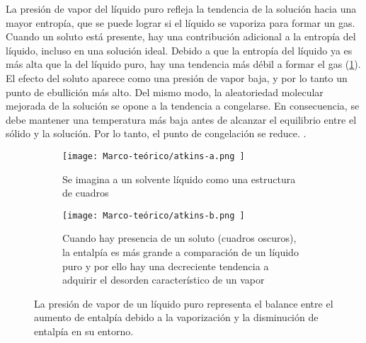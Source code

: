 			\begin{displayquote}
				La presión de vapor del líquido puro refleja la tendencia de la solución hacia una mayor entropía, que se puede lograr si el líquido se vaporiza para formar un gas. Cuando un soluto está presente, hay una contribución adicional a la entropía del líquido, incluso en una solución ideal. Debido a que la entropía del líquido ya es más alta que la del líquido puro, hay una tendencia más débil a formar el gas (\cref{fig:coligativas-pv}). El efecto del soluto aparece como una presión de vapor baja, y por lo tanto un punto de ebullición más alto. Del mismo modo, la aleatoriedad molecular mejorada de la solución se opone a la tendencia a congelarse. En consecuencia, se debe mantener una temperatura más baja antes de alcanzar el equilibrio entre el sólido y la solución. Por lo tanto, el punto de congelación se reduce. \cite{atkins_physical_2010}.
			\end{displayquote}
			\begin{figure}[H]
				\centering
				\begin{subfigure}[t]{0.45\linewidth}
					\centering
					\texttt{[image: 
						Marco-teórico/atkins-a.png
					]}
					\caption{Se imagina a un solvente líquido como una estructura de cuadros}
				\end{subfigure}
				\hfill
				\begin{subfigure}[t]{0.45\linewidth}
					\centering
					\texttt{[image: 
						Marco-teórico/atkins-b.png
					]}
					\caption{Cuando hay presencia de un soluto (cuadros oscuros), la entalpía es más grande a comparación de un líquido puro y por ello hay una decreciente tendencia a adquirir el desorden característico de un vapor}
				\end{subfigure}
				
				\caption{La presión de vapor de un líquido puro representa el balance entre el aumento de entalpía debido a la vaporización y la disminución de entalpía en su entorno.}
				\label{fig:coligativas-pv}
			\end{figure}